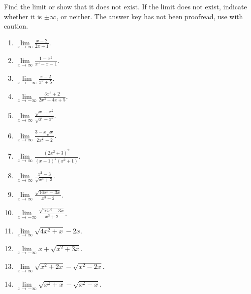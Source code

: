 Find the limit or show that it does not exist. If the limit does not exist, indicate whether it is $\pm\infty$, or neither. The answer key has not been proofread, use with caution.
\begin{multicols}{3}
\begin{enumerate}[ref={\fcProblemRef}]
\item $\displaystyle \lim\limits_{x\to\infty }\frac{x-2}{2x+1}$.

\item $\displaystyle \lim\limits_{x\to\infty }\frac{1-x^2}{x^3-x-1}$.

\item $\displaystyle \lim\limits_{x\to-\infty }\frac{x-2}{x^2+5}$.

\item \label{problemlimxtominusinfty(3x^3+2)/(2x^3-4x+5)} $\displaystyle \lim\limits_{x\to-\infty }\frac{3x^3+2}{2x^3-4x+5}$.

\item $\displaystyle \lim\limits_{x\to\infty }\frac{\sqrt{x}+x^2}{\sqrt{x}-x^2}$.

\item $\displaystyle \lim\limits_{x\to\infty }\frac{3-x\sqrt{x}}{2x^{\frac{3}{2}}-2}$.

\item $\displaystyle \lim\limits_{x\to\infty }\frac{(2x^2+3)^2}{(x-1)^2(x^2+1)}$.

\item $\displaystyle \lim\limits_{x\to\infty }\frac{x^2-3}{\sqrt{x^4+3}}$.

\item $\displaystyle \lim\limits_{x\to\infty }\frac{\sqrt{16x^6-3x}}{x^3+2}$.

\item $\displaystyle \lim\limits_{x\to-\infty }\frac{\sqrt{16x^6-3x}}{x^3+2}$.

\item $\displaystyle \lim\limits_{x\to\infty}\sqrt{4x^2+x}-2x$.

\item $\displaystyle \lim\limits_{x\to-\infty} x+\sqrt{x^2+3x} $.

\item $\lim\limits_{x \to\infty}\sqrt{x^2+2x}- \sqrt{ x^2 -2x} $. 

\item \label{problemlim(xto-infty)sqrt(x^2+x)-sqrt(x^2-x)} $\lim\limits_{x\to -\infty}\sqrt{x^2+x}- \sqrt{ x^2-x}$. 


\end{enumerate}
\end{multicols}
